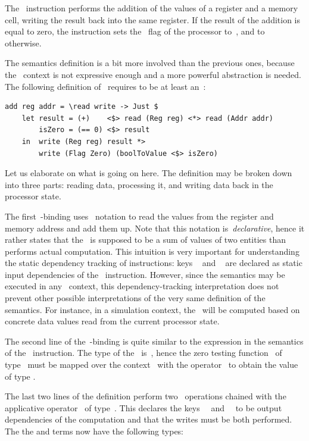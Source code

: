 The~ instruction performs the addition of the values of a register and
a memory cell, writing the result back into the same register. If the result of
the addition is equal to zero, the instruction sets the~ flag of the
processor to~, and to~ otherwise.

The semantics definition is a bit more involved than the previous ones, because
the~ context is not expressive enough and a more powerful
abstraction is needed. The following definition of~ requires
 to be at least an~:

\begin{verbatim}
add reg addr = \read write -> Just $
    let result = (+)    <$> read (Reg reg) <*> read (Addr addr)
        isZero = (== 0) <$> result
    in  write (Reg reg) result *>
        write (Flag Zero) (boolToValue <$> isZero)
\end{verbatim}

\noindent
Let us elaborate on what is going on here. The definition may be broken down
into three parts: reading data, processing it, and writing data back in the
processor state.

The first~-binding uses~ notation to read the values
from the register  and memory address  and add them up. Note
that this notation is~\emph{declarative}, hence it rather states that
the~ is supposed to be a sum of values of two entities than performs
actual computation. This intuition is very important for understanding the
static dependency tracking of instructions: keys ~ and
~ are declared as static input dependencies of the~
instruction. However, since the semantics may be executed in
any~ context, this dependency-tracking interpretation does not
prevent other possible interpretations of the very same definition of the
semantics. For instance, in a simulation context, the~ will be
computed based on concrete data values read from the current processor state.

The second line of the~-binding is quite similar to the expression in the
semantics of the~ instruction. The type of the~ is~,
hence the zero testing function~ of type~
must be mapped over the context~ with the operator~\hs{<$>} to obtain the
value of type .

The last two lines of the definition perform two~ operations chained
with the applicative operator~\hs{*>} of
type~.
This declares the keys~~ and~~ to be output
dependencies of the computation and that the writes must be both performed.
The the  and  terms now have the following types:

